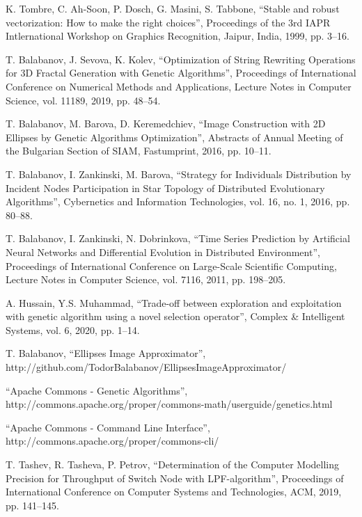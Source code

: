 \documentclass[conference]{IEEEtran}
\begin{document}
\begin{thebibliography}{00}
 K. Tombre, C. Ah-Soon, P. Dosch, G. Masini, S. Tabbone, ``Stable and robust vectorization: How to make the right choices'', Proceedings of the 3rd IAPR Intlernational Workshop on Graphics Recognition, Jaipur, India, 1999, pp. 3--16.

 T. Balabanov, J. Sevova, K. Kolev, ``Optimization of String Rewriting Operations for 3D Fractal Generation with Genetic Algorithms'', Proceedings of International Conference on Numerical Methods and Applications, Lecture Notes in Computer Science, vol. 11189, 2019, pp. 48--54.

 T. Balabanov, M. Barova, D. Keremedchiev, ``Image Construction with 2D Ellipses by Genetic Algorithms Optimization'', Abstracts of Annual Meeting of the Bulgarian Section of SIAM, Fastumprint, 2016, pp. 10--11.

 T. Balabanov, I. Zankinski, M. Barova, ``Strategy for Individuals Distribution by Incident Nodes Participation in Star Topology of Distributed Evolutionary Algorithms'', Cybernetics and Information Technologies, vol. 16, no. 1, 2016, pp. 80--88.

 T. Balabanov, I. Zankinski, N. Dobrinkova, ``Time Series Prediction by Artificial Neural Networks and Differential Evolution in Distributed Environment'', Proceedings of International Conference on Large-Scale Scientific Computing, Lecture Notes in Computer Science, vol. 7116, 2011, pp. 198--205.

 A. Hussain, Y.S. Muhammad, ``Trade-off between exploration and exploitation with genetic algorithm using a novel selection operator'', Complex \& Intelligent Systems, vol. 6, 2020, pp. 1--14.

 T. Balabanov, ``Ellipses Image Approximator'', http://github.com/TodorBalabanov/EllipsesImageApproximator/

 ``Apache Commons - Genetic Algorithms'', http://commons.apache.org/proper/commons-math/userguide/genetics.html

 ``Apache Commons - Command Line Interface'', http://commons.apache.org/proper/commons-cli/

 T. Tashev, R. Tasheva, P. Petrov, ``Determination of the Computer Modelling Precision for Throughput of Switch Node with LPF-algorithm'', Proceedings of  International Conference on Computer Systems and Technologies, ACM, 2019, pp. 141--145.

\end{thebibliography}
\end{document}
